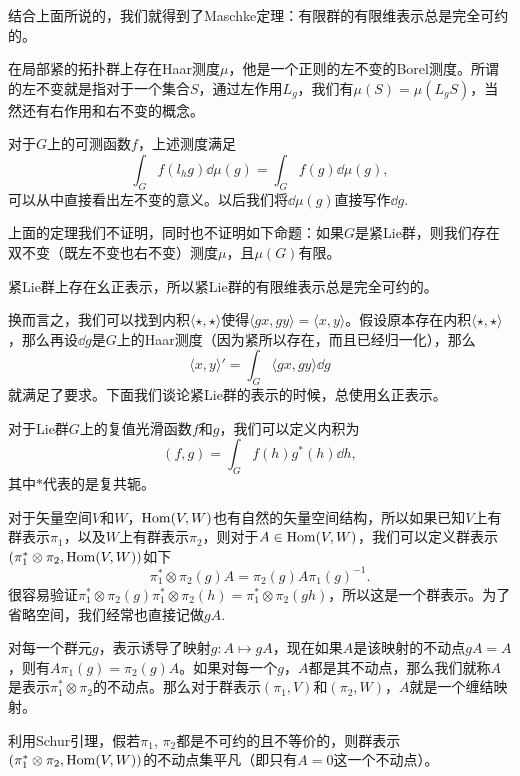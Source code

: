 \begin{thm}
结合上面所说的，我们就得到了Maschke定理：有限群的有限维表示总是完全可约的。 
\end{thm}

\begin{thm}
在局部紧的拓扑群上存在Haar测度$\mu$，他是一个正则的左不变的Borel测度。所谓的左不变就是指对于一个集合$S$，通过左作用$L_g$，我们有$\mu(S)=\mu(L_gS)$，当然还有右作用和右不变的概念。
\end{thm}

对于$G$上的可测函数$f$，上述测度满足
\[
	\int_G f(l_h g)\dd \mu(g)=\int_G f(g)\dd \mu(g),
\]
可以从中直接看出左不变的意义。以后我们将$\dd \mu(g)$直接写作$\dd g$.

\para 上面的定理我们不证明，同时也不证明如下命题：如果$G$是紧Lie群，则我们存在双不变（既左不变也右不变）测度$\mu$，且$\mu(G)$有限。

\begin{pro}
紧Lie群上存在幺正表示，所以紧Lie群的有限维表示总是完全可约的。 
\end{pro}

换而言之，我们可以找到内积$\langle \star,\star\rangle$使得$\langle gx,gy\rangle=\langle x,y\rangle$。假设原本存在内积$\langle \star,\star \rangle$，那么再设$\dd g$是$G$上的Haar测度（因为紧所以存在，而且已经归一化），那么
\[
	\langle x,y\rangle'=\int_G \langle gx,gy \rangle \dd g
\]
就满足了要求。下面我们谈论紧Lie群的表示的时候，总使用幺正表示。

\para 对于Lie群$G$上的复值光滑函数$f$和$g$，我们可以定义内积为
\[
	(f,g)=\int_G f(h)g^*(h)\dd h,
\]
其中$*$代表的是复共轭。

\para 对于矢量空间$V$和$W$，$\operatorname{Hom}(V,W)$也有自然的矢量空间结构，所以如果已知$V$上有群表示$\pi_1$，以及$W$上有群表示$\pi_2$，则对于$A\in \operatorname{Hom}(V,W)$，我们可以定义群表示$(\pi_1^*\otimes\pi_2,\operatorname{Hom}(V,W))$如下
\[
	\pi_1^*\otimes\pi_2(g)A=\pi_2(g)A\pi_1(g)^{-1}.
\]
很容易验证$\pi_1^*\otimes\pi_2(g)\pi_1^*\otimes\pi_2(h)=\pi_1^*\otimes\pi_2(gh)$，所以这是一个群表示。为了省略空间，我们经常也直接记做$gA$.

对每一个群元$g$，表示诱导了映射$g:A\mapsto gA$，现在如果$A$是该映射的不动点$gA=A$，则有$A\pi_1(g)=\pi_2(g)A$。如果对每一个$g$，$A$都是其不动点，那么我们就称$A$是表示$\pi_1^*\otimes\pi_2$的不动点。那么对于群表示$(\pi_1,V)$和$(\pi_2,W)$，$A$就是一个缠结映射。

\para 利用Schur引理，假若$\pi_1$, $\pi_2$都是不可约的且不等价的，则群表示$(\pi_1^*\otimes\pi_2,\operatorname{Hom}(V,W))$的不动点集平凡（即只有$A=0$这一个不动点）。

